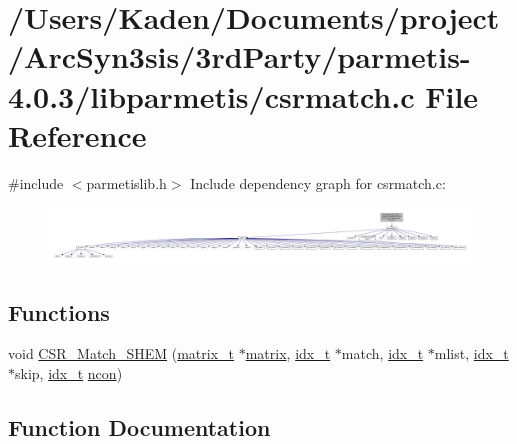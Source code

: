 \hypertarget{a00347}{}\section{/\+Users/\+Kaden/\+Documents/project/\+Arc\+Syn3sis/3rd\+Party/parmetis-\/4.0.3/libparmetis/csrmatch.c File Reference}
\label{a00347}
{\ttfamily \#include $<$parmetislib.\+h$>$}\newline
Include dependency graph for csrmatch.\+c\+:\nopagebreak
\begin{figure}[H]
\begin{center}
\leavevmode
\includegraphics[width=350pt]{a00348}
\end{center}
\end{figure}
\subsection*{Functions}
\begin{DoxyCompactItemize}
\item 
void \hyperlink{a00347_a7171b4b1ffd62a2ebee9863c25f73652}{C\+S\+R\+\_\+\+Match\+\_\+\+S\+H\+EM} (\hyperlink{a00754}{matrix\+\_\+t} $\ast$\hyperlink{a01014_af07ff1035f34d77764ff516f110e6832}{matrix}, \hyperlink{a00876_aaa5262be3e700770163401acb0150f52}{idx\+\_\+t} $\ast$match, \hyperlink{a00876_aaa5262be3e700770163401acb0150f52}{idx\+\_\+t} $\ast$mlist, \hyperlink{a00876_aaa5262be3e700770163401acb0150f52}{idx\+\_\+t} $\ast$skip, \hyperlink{a00876_aaa5262be3e700770163401acb0150f52}{idx\+\_\+t} \hyperlink{a00879_ac1dd31740e8f97fb57dc917ded30253f}{ncon})
\end{DoxyCompactItemize}


\subsection{Function Documentation}
\mbox{\label{a00347_a7171b4b1ffd62a2ebee9863c25f73652}} 
